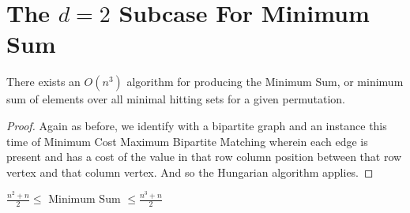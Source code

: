 \documentclass[12pt]{article}
\begin{document}





\section{The $d = 2$ Subcase For Minimum Sum}

\begin{theorem}\label{Thm:$d = 2$ Minimum Sum Algorithm}
	There exists an $O(n^{3})$ algorithm for producing the Minimum Sum, or minimum sum of elements over all minimal hitting sets for a given permutation.
\end{theorem}

\begin{proof}
	Again as before, we identify with a bipartite graph and an instance this time of Minimum Cost Maximum Bipartite Matching wherein each edge is present and has a cost of the value in that row column position between that row vertex and that column vertex. And so the Hungarian algorithm applies.
\end{proof}

\begin{theorem}\label{Thm:$d = 2$ Minimum Sum Bounds}
	$\frac{n^2+n}{2} \le \text{ Minimum Sum } \le \frac{n^3+n}{2}$
\end{theorem}
\end{document}
